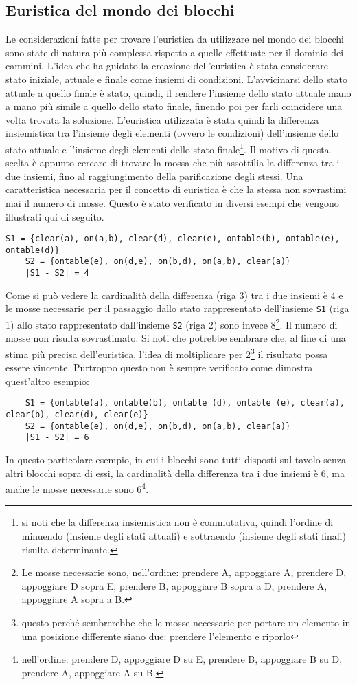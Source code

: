 \subsection{Euristica del mondo dei blocchi}
Le considerazioni fatte per trovare l'euristica da utilizzare nel mondo dei blocchi sono state di natura più complessa rispetto a quelle effettuate per il dominio dei cammini. L'idea che ha guidato la creazione dell'euristica è stata considerare stato iniziale, attuale e finale come insiemi di condizioni. L'avvicinarsi dello stato attuale a quello finale è stato, quindi, il rendere l'insieme dello stato attuale mano a mano più simile a quello dello stato finale, finendo poi per farli coincidere una volta trovata la soluzione. L'euristica utilizzata è stata quindi la differenza insiemistica tra l'insieme degli elementi (ovvero le condizioni) dell'insieme dello stato attuale e l'insieme degli elementi dello stato finale\footnote{si noti che la differenza insiemistica non è commutativa, quindi l'ordine di minuendo (insieme degli stati attuali) e sottraendo (insieme degli stati finali) risulta determinante.}.
Il motivo di questa scelta è appunto cercare di trovare la mossa che più assottilia la differenza tra i due insiemi, fino al raggiungimento della parificazione degli stessi. Una caratteristica necessaria per il concetto di euristica è che la stessa non sovrastimi mai il numero di mosse. Questo è stato verificato in diversi esempi che vengono illustrati qui di seguito.
\begin{lstlisting}[frame=tb]
	S1 = {clear(a), on(a,b), clear(d), clear(e), ontable(b), ontable(e), ontable(d)}
	S2 = {ontable(e), on(d,e), on(b,d), on(a,b), clear(a)}
	|S1 - S2| = 4
\end{lstlisting}
Come si può vedere la cardinalità della differenza (riga 3) tra i due insiemi è 4 e le mosse necessarie per il passaggio dallo stato rappresentato dell'insieme \texttt{S1} (riga 1) allo stato rappresentato dall'insieme \texttt{S2} (riga 2) sono invece 8\footnote{Le mosse necessarie sono, nell'ordine: prendere A, appoggiare A, prendere D, appoggiare D sopra E, prendere B, appoggiare B sopra a D, prendere A, appoggiare A sopra a B.}. Il numero di mosse non risulta sovrastimato. Si noti che potrebbe sembrare che, al fine di una stima più precisa dell'euristica, l'idea di moltiplicare per 2\footnote{questo perché sembrerebbe che le mosse necessarie per portare un elemento in una posizione differente siano due: prendere l'elemento e riporlo} il risultato possa essere vincente. Purtroppo questo non è sempre verificato come dimostra quest'altro esempio:
\begin{lstlisting}
	S1 = {ontable(a), ontable(b), ontable (d), ontable (e), clear(a), clear(b), clear(d), clear(e)}
	S2 = {ontable(e), on(d,e), on(b,d), on(a,b), clear(a)}
	|S1 - S2| = 6
\end{lstlisting}
In questo particolare esempio, in cui i blocchi sono tutti disposti sul tavolo senza altri blocchi sopra di essi, la cardinalità della differenza tra i due insiemi è 6, ma anche le mosse necessarie sono 6\footnote{nell'ordine: prendere D, appoggiare D su E, prendere B, appoggiare B su D, prendere A, appoggiare A su B.}.

